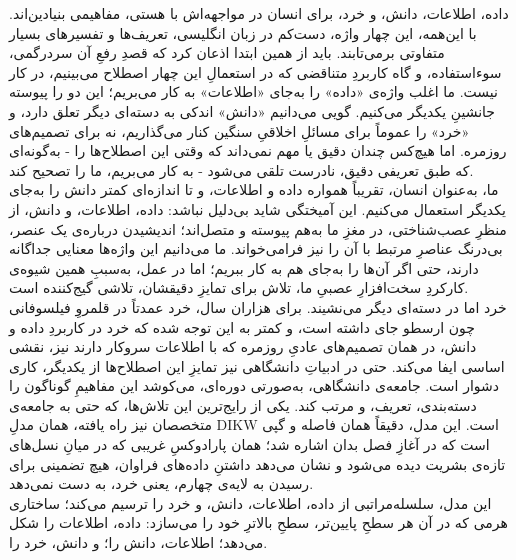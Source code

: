 داده، اطلاعات، دانش، و خرد، برای انسان در مواجهه‌اش با هستی، مفاهیمی بنیادین‌اند. با این‌همه، این چهار واژه، دست‌کم در زبان انگلیسی، تعریف‌ها و تفسیرهای بسیار متفاوتی برمی‌تابند. باید از همین ابتدا اذعان کرد که قصدِ رفعِ آن سردرگمی، سوءاستفاده، و گاه کاربردِ متناقضی که در استعمالِ این چهار اصطلاح می‌بینیم، در کار نیست. ما اغلب واژه‌ی «داده» را به‌جای «اطلاعات» به کار می‌بریم؛ این دو را پیوسته جانشینِ یکدیگر می‌کنیم. گویی می‌دانیم «دانش» اندکی به دسته‌ای دیگر تعلق دارد، و «خرد» را عموماً برای مسائلِ اخلاقیِ سنگین کنار می‌گذاریم، نه برای تصمیم‌های روزمره. اما هیچ‌کس چندان دقیق یا مهم نمی‌داند که وقتی این اصطلاح‌ها را - به‌گونه‌ای که طبق تعریفی دقیق، نادرست تلقی می‌شود - به کار می‌بریم، ما را تصحیح کند.\\
ما، به‌عنوان انسان، تقریباً همواره داده و اطلاعات، و تا اندازه‌ای کمتر دانش را به‌جای یکدیگر استعمال می‌کنیم. این آمیختگی شاید بی‌دلیل نباشد: داده، اطلاعات، و دانش، از منظرِ عصب‌شناختی، در مغزِ ما به‌هم پیوسته و متصل‌اند\autocite{seung2012}؛ اندیشیدن درباره‌ی یک عنصر، بی‌درنگ عناصرِ مرتبط با آن را نیز فرامی‌خواند. ما می‌دانیم این واژه‌ها معنایی جداگانه دارند، حتی اگر آن‌ها را به‌جای هم به کار ببریم؛ اما در عمل، به‌سببِ همین شیوه‌ی کارکردِ سخت‌افزارِ عصبیِ ما، تلاش برای تمایزِ دقیقشان، تلاشی گیج‌کننده است.\\
خرد اما در دسته‌ای دیگر می‌نشیند. برای هزاران سال، خرد عمدتاً در قلمروِ فیلسوفانی چون ارسطو جای داشته است\autocite{aristotle2020}، و کمتر به این توجه شده که خرد در کاربردِ داده و دانش، در همان تصمیم‌های عادیِ روزمره که با اطلاعات سروکار دارند نیز، نقشی اساسی ایفا می‌کند. حتی در ادبیاتِ دانشگاهی نیز تمایزِ این اصطلاح‌ها از یکدیگر، کاری دشوار است. جامعه‌ی دانشگاهی، به‌صورتی دوره‌ای، می‌کوشد این مفاهیمِ گوناگون را دسته‌بندی، تعریف، و مرتب کند. یکی از رایج‌ترین این تلاش‌ها، که حتی به جامعه‌ی متخصصان نیز راه یافته، همان مدلِ DIKW است. این مدل، دقیقاً همان فاصله و گپی است که در آغازِ فصل بدان اشاره شد؛ همان پارادوکسِ غریبی که در میانِ نسل‌های تازه‌ی بشریت دیده می‌شود و نشان می‌دهد داشتنِ داده‌های فراوان، هیچ تضمینی برای رسیدن به لایه‌ی چهارم، یعنی خرد، به دست نمی‌دهد.\\
این مدل، سلسله‌مراتبی از داده، اطلاعات، دانش، و خرد را ترسیم می‌کند؛ ساختاری هرمی که در آن هر سطحِ پایین‌تر، سطحِ بالاترِ خود را می‌سازد: داده، اطلاعات را شکل می‌دهد؛ اطلاعات، دانش را؛ و دانش، خرد را.\\

